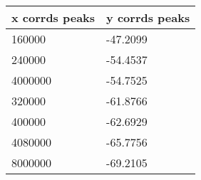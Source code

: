 \begin{tabular}{ll}
x corrds peaks & y corrds peaks \\ 
\hline 
160000 & -47.2099 \\ 
240000 & -54.4537 \\ 
4000000 & -54.7525 \\ 
320000 & -61.8766 \\ 
400000 & -62.6929 \\ 
4080000 & -65.7756 \\ 
8000000 & -69.2105 \\ 
\hline 
\end{tabular}